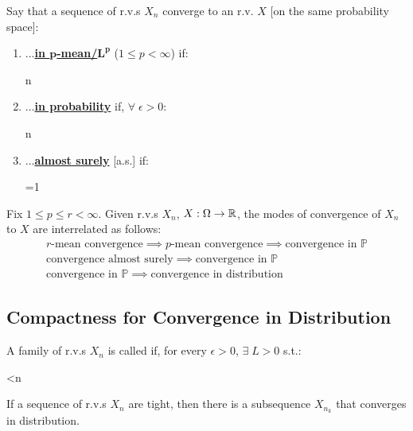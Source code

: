 \documentclass[12pt]{extarticle}
\begin{document}
\begin{tcolorbox}[colback=white]
    Say that a sequence of r.v.s $X_n$ converge to an r.v. $X$ [on the same probability space]: \begin{enumerate}
        \item ...\ul{\textbf{in $\mathbf{p}$-mean/$\mathbf{L^p}$}} ($1\leq p<\infty$) if: \begin{eqnbox}
            n\to\infty
        \end{eqnbox}
        \item ...\ul{\textbf{in probability}} if, $\forall\;\epsilon>0$: \begin{eqnbox}
            n\to\infty
        \end{eqnbox}
        \item ...\ul{\textbf{almost surely}} [a.s.] if: \begin{eqnbox}
            =1
        \end{eqnbox}
    \end{enumerate}
\end{tcolorbox}

\begin{theorem}
    Fix $1\leq p\leq r<\infty$. Given r.v.s $X_n$, $X:\Omega\to\mathbb{R}$, the modes of convergence of $X_n$ to $X$ are interrelated as follows: \begin{gather}
        \text{$r$-mean convergence}\implies\text{$p$-mean convergence}\implies\text{convergence in $\mathbb{P}$} \\
        \text{convergence almost surely}\implies\text{convergence in $\mathbb{P}$} \\
        \text{convergence in $\mathbb{P}$}\implies\text{convergence in distribution}
    \end{gather}
\end{theorem}

\subsection{Compactness for Convergence in Distribution}
\begin{tcolorbox}[colback=white]
    \begin{definition}
        A family of r.v.s $X_n$ is called  if, for every $\epsilon>0$, $\exists\;L>0$ s.t.: \begin{eqnbox}
            <\epsilon\;\forall\;n\in\naturals
        \end{eqnbox}
    \end{definition}

    \vspace{-4pt}
    \ctrrule{12cm}{0.6pt}
    
    \begin{theorem}
        If a sequence of r.v.s $X_n$ are tight, then there is a subsequence $X_{n_k}$ that converges in distribution.
    \end{theorem}
\end{tcolorbox}
\end{document}

